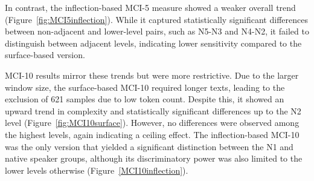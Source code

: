 
In contrast, the inflection-based MCI-5 measure showed a weaker overall trend (Figure~\ref{fig:MCI5inflection}).
While it captured
statistically
significant differences between non-adjacent and lower-level pairs, such as N5-N3 and N4-N2, it failed to distinguish
between adjacent levels, indicating lower sensitivity compared to the surface-based version.



MCI-10 results mirror these trends but were more restrictive. Due to the larger window size, the surface-based MCI-10
required longer texts, leading to the exclusion of 621 samples due to low token count.  Despite this, it showed an
upward trend in complexity and statistically significant differences up to the N2 level (Figure~\ref{fig:MCI10surface}). However, no
differences were
observed among the highest levels, again indicating a ceiling effect. The inflection-based MCI-10 was the only
version that yielded a significant distinction between the N1 and native speaker groups, although its discriminatory
power was also limited to the lower levels otherwise (Figure~\ref{MCI10inflection}).


